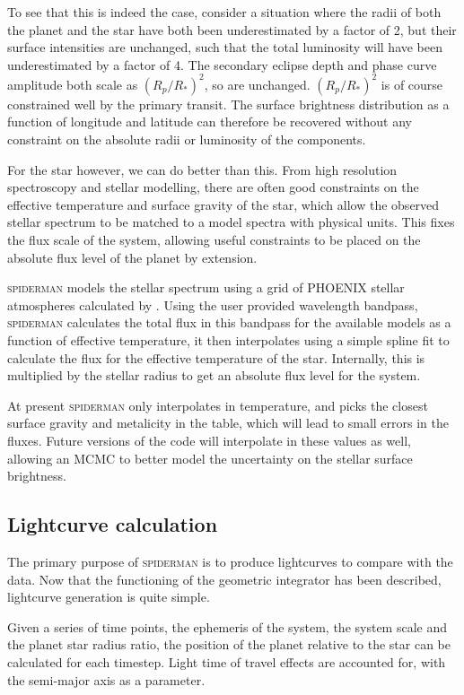 \documentclass[a4paper,fleqn,usenatbib]{mnras}
\begin{document}
To see that this is indeed the case, consider a situation where the radii of both the planet and the star have both been underestimated by a factor of 2, but their surface intensities are unchanged, such that the total luminosity will have been underestimated by a factor of 4. The secondary eclipse depth and phase curve amplitude both scale as $(R_p / R_*)^2$, so are unchanged. $(R_p / R_*)^2$ is of course constrained well by the primary transit. The surface brightness distribution as a function of longitude and latitude can therefore be recovered without any constraint on the absolute radii or luminosity of the components.

For the star however, we can do better than this. From high resolution spectroscopy and stellar modelling, there are often good constraints on the effective temperature and surface gravity of the star, which allow the observed stellar spectrum to be matched to a model spectra with physical units. This fixes the flux scale of the system, allowing useful constraints to be placed on the absolute flux level of the planet by extension.

\textsc{spiderman} models the stellar spectrum using a grid of PHOENIX stellar atmospheres calculated by \citet{Husser2013}. Using the user provided wavelength bandpass, \textsc{spiderman} calculates the total flux in this bandpass for the available models as a function of effective temperature, it then interpolates using a simple spline fit to calculate the flux for the effective temperature of the star. Internally, this is multiplied by the stellar radius to get an absolute flux level for the system.

At present \textsc{spiderman} only interpolates in temperature, and picks the closest surface gravity and metalicity in the table, which will lead to small errors in the fluxes. Future versions of the code will interpolate in these values as well, allowing an MCMC to better model the uncertainty on the stellar surface brightness.

\subsection{Lightcurve calculation}\label{sec:lightcurve}

The primary purpose of \textsc{spiderman} is to produce lightcurves to compare with the data. Now that the functioning of the geometric integrator has been described, lightcurve generation is quite simple.

Given a series of time points, the ephemeris of the system, the system scale and the planet star radius ratio, the position of the planet relative to the star can be calculated for each timestep. Light time of travel effects are accounted for, with the semi-major axis as a parameter.
\end{document}
